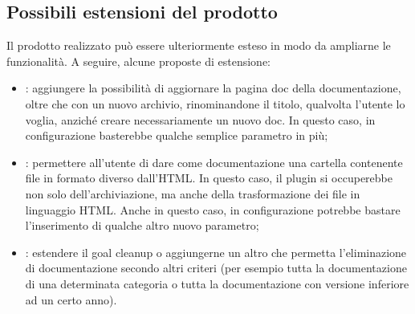 \subsection{Possibili estensioni del prodotto}
Il prodotto realizzato può essere ulteriormente esteso in modo da ampliarne le funzionalità.
A seguire, alcune proposte di estensione:
\begin{itemize}
    \item {}: aggiungere la possibilità di aggiornare la pagina doc della documentazione, oltre che con un nuovo archivio, rinominandone il titolo, qualvolta l'utente lo voglia, anziché creare necessariamente un nuovo doc. In questo caso, in configurazione basterebbe qualche semplice parametro in più;
    \item {}: permettere all'utente di dare come documentazione una cartella contenente file in formato diverso dall'HTML. In questo caso, il plugin si occuperebbe non solo dell'archiviazione, ma anche della trasformazione dei file in linguaggio HTML. Anche in questo caso, in configurazione potrebbe bastare l'inserimento di qualche altro nuovo parametro;
    \item {}: estendere il goal cleanup o aggiungerne un altro che permetta l'eliminazione di documentazione secondo altri criteri (per esempio tutta la documentazione di una determinata categoria o tutta la documentazione con versione inferiore ad un certo anno).
\end{itemize} 

